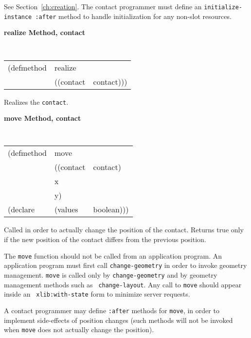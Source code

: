 \begin{flushright} \parbox[t]{6.125in}{
See Section~\ref{ch:creation}. The contact programmer must define an
{\tt initialize-instance :after} method to  
handle initialization for any non-slot resources.
 
}\end{flushright}



{\large {\bf realize \hfill Method, contact}}
\begin{flushright} \parbox[t]{6.125in}{
\tt
\begin{tabular}{lll}
\raggedright
(defmethod & realize & \\
& ((contact  &contact)))
\end{tabular}
\rm

}\end{flushright}

\begin{flushright} \parbox[t]{6.125in}{
Realizes the {\tt contact}.
}\end{flushright}

{\samepage
{\large {\bf move \hfill Method, contact}}
\begin{flushright}
\parbox[t]{6.125in}{
\tt
\begin{tabular}{lll}
\raggedright
(defmethod & move & \\
& ((contact  &contact)\\
& x & \\
& y)\\
(declare & (values & boolean)))
\end{tabular}
\rm
}\end{flushright}
}

\begin{flushright} \parbox[t]{6.125in}{
Called in order to actually change the position of the contact.
Returns true only if the new position of the contact differs from the previous
position.  

The {\tt move} function should not be called from an application program.  An
application program must first call {\tt change-geometry}  in order to invoke geometry management.  {\tt move} is called only by
{\tt change-geometry} and by geometry management methods such as {\tt
change-layout}. Any call to {\tt move} should appear inside an {\tt
xlib:with-state} form to minimize server requests.

A contact programmer may define {\tt :after} methods for {\tt move}, in order to
implement side-effects of position changes (such methods will not be invoked when
{\tt move} does not actually change the position).

}\end{flushright}

